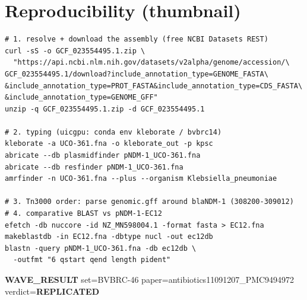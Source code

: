 \documentclass[11pt]{article}
\begin{document}
\section*{Reproducibility (thumbnail)}
\begin{verbatim}
# 1. resolve + download the assembly (free NCBI Datasets REST)
curl -sS -o GCF_023554495.1.zip \
  "https://api.ncbi.nlm.nih.gov/datasets/v2alpha/genome/accession/\
GCF_023554495.1/download?include_annotation_type=GENOME_FASTA\
&include_annotation_type=PROT_FASTA&include_annotation_type=CDS_FASTA\
&include_annotation_type=GENOME_GFF"
unzip -q GCF_023554495.1.zip -d GCF_023554495.1

# 2. typing (uicgpu: conda env kleborate / bvbrc14)
kleborate -a UCO-361.fna -o kleborate_out -p kpsc
abricate --db plasmidfinder pNDM-1_UCO-361.fna
abricate --db resfinder pNDM-1_UCO-361.fna
amrfinder -n UCO-361.fna --plus --organism Klebsiella_pneumoniae

# 3. Tn3000 order: parse genomic.gff around blaNDM-1 (308200-309012)
# 4. comparative BLAST vs pNDM-1-EC12
efetch -db nuccore -id NZ_MN598004.1 -format fasta > EC12.fna
makeblastdb -in EC12.fna -dbtype nucl -out ec12db
blastn -query pNDM-1_UCO-361.fna -db ec12db \
  -outfmt "6 qstart qend length pident"
\end{verbatim}

\vspace{1em}
\noindent\textbf{WAVE\_RESULT} \quad set=BVBRC-46 \quad
paper=antibiotics11091207\_PMC9494972 \quad verdict=\textbf{REPLICATED}
\end{document}

